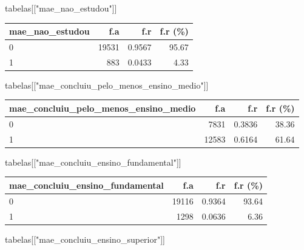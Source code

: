 \documentclass[
]{article}
\newenvironment{Shaded}{\begin{snugshade}}{\end{snugshade}}
\newcommand{\NormalTok}[1]{\textcolor[rgb]{0.00,0.23,0.31}{#1}}
\newcommand{\StringTok}[1]{\textcolor[rgb]{0.13,0.47,0.30}{#1}}
\begin{document}
\begin{Shaded}
\begin{Highlighting}[]
\NormalTok{tabelas[[}\StringTok{"mae\_nao\_estudou"}\NormalTok{]]}
\end{Highlighting}
\end{Shaded}

\begin{longtable}[]{@{}lrrr@{}}
\toprule()
mae\_nao\_estudou & f.a & f.r & f.r (\%) \\
\midrule()
\endhead
0 & 19531 & 0.9567 & 95.67 \\
1 & 883 & 0.0433 & 4.33 \\
\bottomrule()
\end{longtable}

\begin{Shaded}
\begin{Highlighting}[]
\NormalTok{tabelas[[}\StringTok{"mae\_concluiu\_pelo\_menos\_ensino\_medio"}\NormalTok{]]}
\end{Highlighting}
\end{Shaded}

\begin{longtable}[]{@{}lrrr@{}}
\toprule()
mae\_concluiu\_pelo\_menos\_ensino\_medio & f.a & f.r & f.r (\%) \\
\midrule()
\endhead
0 & 7831 & 0.3836 & 38.36 \\
1 & 12583 & 0.6164 & 61.64 \\
\bottomrule()
\end{longtable}

\begin{Shaded}
\begin{Highlighting}[]
\NormalTok{tabelas[[}\StringTok{"mae\_concluiu\_ensino\_fundamental"}\NormalTok{]]}
\end{Highlighting}
\end{Shaded}

\begin{longtable}[]{@{}lrrr@{}}
\toprule()
mae\_concluiu\_ensino\_fundamental & f.a & f.r & f.r (\%) \\
\midrule()
\endhead
0 & 19116 & 0.9364 & 93.64 \\
1 & 1298 & 0.0636 & 6.36 \\
\bottomrule()
\end{longtable}

\begin{Shaded}
\begin{Highlighting}[]
\NormalTok{tabelas[[}\StringTok{"mae\_concluiu\_ensino\_superior"}\NormalTok{]]}
\end{Highlighting}
\end{Shaded}
\end{document}
